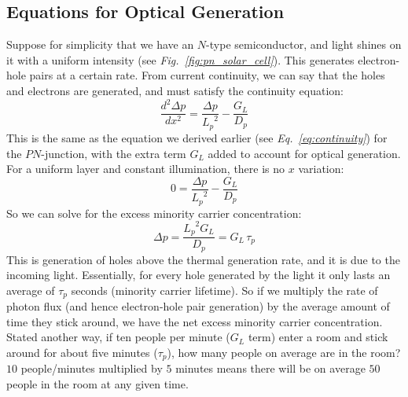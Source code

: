 \subsection{Equations for Optical Generation}
Suppose for simplicity that we have an $N$-type semiconductor, and light shines on it with a uniform intensity (see \emph{Fig.~\ref{fig:pn_solar_cell}}).  This generates electron-hole pairs at a certain rate.  From current continuity, we can say that the holes and electrons are generated, and must satisfy the continuity equation:
    \begin{equation} 
        \frac{d^2 \Delta p}{dx^2} = \frac{\Delta p}{{L_p}^2} - \frac{G_L}{D_p}
    \end{equation}
This is the same as the equation we derived earlier (see \emph{Eq.~\ref{eq:continuity}}) for the $PN$-junction, with the extra term $G_L$ added to account for optical generation.  For a uniform layer and constant illumination, there is no $x$ variation: 
    \begin{equation} 
        0 = \frac{\Delta p}{{L_p}^2} - \frac{G_L}{D_p}
    \end{equation}
So we can solve for the excess minority carrier concentration:
    \begin{equation} 
        \Delta p = \frac{{L_p}^2 G_L}{D_p} = G_L\,\tau_p
    \end{equation}
This is generation of holes above the thermal generation rate, and it is due to the incoming light.  Essentially, for every hole generated by the light it only lasts an average of $\tau_p$ seconds (minority carrier lifetime).  So if we multiply the rate of photon flux (and hence electron-hole pair generation) by the average amount of time they stick around, we have the net excess minority carrier concentration.   Stated another way, if ten people per minute ($G_L$ term) enter a room and stick around for about five minutes ($\tau_p$), how many people on average are in the room?   $10$ people/minutes multiplied by $5$ minutes means there will be on average $50$ people in the room at any given time.  
